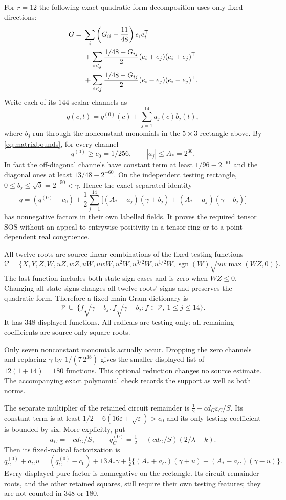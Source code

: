 \documentclass[11pt]{article}
\newcommand{\eps}{\varepsilon}
\begin{document}
For $r=12$ the following exact quadratic-form decomposition uses
only fixed directions:
\[
\begin{split}
 G={}&\sum_i\left(G_{ii}-{11\over48}\right)e_ie_i^{\mathsf T}\\
 &+\sum_{i<j}{1/48+G_{ij}\over2}(e_i+e_j)(e_i+e_j)^{\mathsf T}\\
 &+\sum_{i<j}{1/48-G_{ij}\over2}(e_i-e_j)(e_i-e_j)^{\mathsf T}.
\end{split}
\]
Write each of its $144$ scalar channels as
\[
 q(c,t)=q^{(0)}(c)+\sum_{j=1}^{14}a_j(c)b_j(t),
\]
where $b_j$ run through the nonconstant monomials in the
$5\times3$ rectangle above. By \eqref{eq:matrixbounds}, for every
channel
\[
 q^{(0)}\ge c_0=1/256,\qquad |a_j|\le A_*=2^{30}.
\]
In fact the off-diagonal channels have constant term at least
$1/96-2^{-61}$ and the diagonal ones at least $13/48-2^{-60}$.
On the independent testing rectangle,
$0\le b_j\le\sqrt\delta=2^{-50}<\gamma$.
Hence the exact separated identity
\[
 q=(q^{(0)}-c_0)+\frac12\sum_{j=1}^{14}
 \bigl[(A_*+a_j)(\gamma+b_j)+(A_*-a_j)(\gamma-b_j)\bigr]
\]
has nonnegative factors in their own labelled fields. It proves
the required tensor SOS without an appeal to entrywise positivity
in a tensor ring or to a point-dependent real congruence.

All twelve roots are source-linear combinations of the fixed
testing functions
\[
 \mathcal V=\{X,Y,Z,W,uZ,wZ,uW,uwW,u^2W,
                u^{3/2}W,u^{1/2}W,
                  \operatorname{sgn}(W)\sqrt{uw\max(WZ,0)}\}.
\]
The last function includes both state-sign cases and is zero
when $WZ\le0$. Changing all state signs changes all twelve roots'
signs and preserves the quadratic form.
Therefore a fixed main-Gram dictionary is
\[
 \mathcal V\ \cup\ \{f\sqrt{\gamma+b_j},f\sqrt{\gamma-b_j}:
                         f\in\mathcal V,\ 1\le j\le14\}.
\]
It has $348$ displayed functions. All radicals are testing-only;
all remaining coefficients are source-only square roots.

Only seven nonconstant monomials actually occur. Dropping the zero
channels and replacing $\gamma$ by $1/(7\,2^{38})$ gives the
smaller displayed list of $12(1+14)=180$ functions. This optional
reduction changes no source estimate. The accompanying exact
polynomial check records the support as well as both norms.

The separate multiplier of the retained circuit remainder is
$\tfrac12-cd_G\eps_C/S$. Its constant term is at least
$1/2-6(16\eps+\sqrt\eps)>c_0$ and its only testing coefficient
is bounded by six. More explicitly, put
\[
 a_C=-cd_G/S,\qquad
 q_C^{(0)}=\tfrac12-(cd_G/S)(2/\lambda+k).
\]
Then its fixed-radical factorization is
\[
 q_C^{(0)}+a_Cu=(q_C^{(0)}-c_0)+13A_*\gamma
 +\tfrac12\{(A_*+a_C)(\gamma+u)
                          +(A_*-a_C)(\gamma-u)\}.
\]
Every displayed pure factor is nonnegative on the rectangle.
Its circuit remainder roots, and the other retained squares,
still require their own testing features; they are not counted
in $348$ or $180$.
\end{document}
